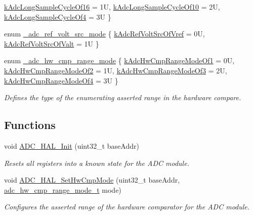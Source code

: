 \begin{DoxyCompactItemize}
\hyperlink{group__adc__hal_ggaf94ec953aeb0bd7abe1364f39e75b135a84213ac958bf0e3ba239431c359d6491}{k\+Adc\+Long\+Sample\+Cycle\+Of16} = 1U, 
\hyperlink{group__adc__hal_ggaf94ec953aeb0bd7abe1364f39e75b135a24d12c6a7bb891535d8c3ecead4fb2c7}{k\+Adc\+Long\+Sample\+Cycle\+Of10} = 2U, 
\hyperlink{group__adc__hal_ggaf94ec953aeb0bd7abe1364f39e75b135aa28cc507c93ee3cf2f921e21f7e1b8ea}{k\+Adc\+Long\+Sample\+Cycle\+Of4} = 3U
 \}
\item 
enum \hyperlink{group__adc__hal_gaba9f6fde8624e91c053734dd84478b8e}{\+\_\+adc\+\_\+ref\+\_\+volt\+\_\+src\+\_\+mode} \{ \hyperlink{group__adc__hal_ggaba9f6fde8624e91c053734dd84478b8eae122b9147e7f63253e1ac28f98a91b75}{k\+Adc\+Ref\+Volt\+Src\+Of\+Vref} = 0U, 
\hyperlink{group__adc__hal_ggaba9f6fde8624e91c053734dd84478b8ea727c0155df8162d2132cff1f51001282}{k\+Adc\+Ref\+Volt\+Src\+Of\+Valt} = 1U
 \}
\item 
enum \hyperlink{group__adc__hal_ga14559d14c936d0c6955676098ed26a08}{\+\_\+adc\+\_\+hw\+\_\+cmp\+\_\+range\+\_\+mode} \{ \hyperlink{group__adc__hal_gga14559d14c936d0c6955676098ed26a08a7c952a491603be1b9f3c910832399903}{k\+Adc\+Hw\+Cmp\+Range\+Mode\+Of1} = 0U, 
\hyperlink{group__adc__hal_gga14559d14c936d0c6955676098ed26a08a614b8ac8fc43ae04186237c7cfcabf57}{k\+Adc\+Hw\+Cmp\+Range\+Mode\+Of2} = 1U, 
\hyperlink{group__adc__hal_gga14559d14c936d0c6955676098ed26a08a75fa7df052064851f6283a660e1ef169}{k\+Adc\+Hw\+Cmp\+Range\+Mode\+Of3} = 2U, 
\hyperlink{group__adc__hal_gga14559d14c936d0c6955676098ed26a08a1697a1c863e81f044280490558b8d407}{k\+Adc\+Hw\+Cmp\+Range\+Mode\+Of4} = 3U
 \}\begin{DoxyCompactList}\small\item\em Defines the type of the enumerating asserted range in the hardware compare. \end{DoxyCompactList}
\end{DoxyCompactItemize}
\subsection*{Functions}
\begin{DoxyCompactItemize}
\item 
void \hyperlink{group__adc__hal_ga4fdc924f8ad31ab8e338832527c90926}{A\+D\+C\+\_\+\+H\+A\+L\+\_\+\+Init} (uint32\+\_\+t base\+Addr)
\begin{DoxyCompactList}\small\item\em Resets all registers into a known state for the A\+DC module. \end{DoxyCompactList}\item 
void \hyperlink{group__adc__hal_ga56a679caa5dacd9279e2d4d0a6d9ae3e}{A\+D\+C\+\_\+\+H\+A\+L\+\_\+\+Set\+Hw\+Cmp\+Mode} (uint32\+\_\+t base\+Addr, \hyperlink{group__adc__hal_ga233a744e31dcfed41f7cefadda54b592}{adc\+\_\+hw\+\_\+cmp\+\_\+range\+\_\+mode\+\_\+t} mode)
\begin{DoxyCompactList}\small\item\em Configures the asserted range of the hardware comparator for the A\+DC module. \end{DoxyCompactList}\end{DoxyCompactItemize}


